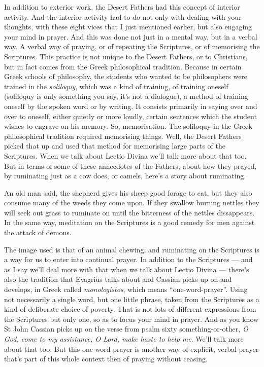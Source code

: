 In addition to exterior work, the Desert Fathers had this concept of interior activity. And the interior activity had to do not only with dealing with your thoughts, with these eight vices that I just mentioned earlier, but also engaging your mind in prayer. And this was done not just in a mental way, but in a verbal way. A verbal way of praying, or of repeating the Scriptures, or of memorising the Scriptures. This practice is not unique to the Desert Fathers, or to Christians, but in fact comes from the Greek philosophical tradition. Because in certain Greek schools of philosophy, the students who wanted to be philosophers were trained in the \emph{soliloquy}, which was a kind of training, of training oneself (soliloquy is only something you say, it's not a dialogue), a method of training oneself by the spoken word or by writing. It consists primarily in saying over and over to oneself, either quietly or more loudly, certain sentences which the student wishes to engrave on his memory. So, memorisation. The soliloquy in the Greek philosophical tradition required memorising things. Well, the Desert Fathers picked that up and used that method for memorising large parts of the Scriptures. When we talk about Lectio Divina we'll talk more about that too. But in terms of some of these annecdotes of the Fathers, about how they prayed, by ruminating just as a cow does, or camels, here's a story about ruminating.

An old man said, the shepherd gives his sheep good forage to eat, but they also consume many of the weeds they come upon. If they swallow burning nettles they will seek out grass to ruminate on until the bitterness of the nettles dissappears. In the same way, meditation on the Scriptures is a good remedy for men against the attack of demons.

The image used is that of an animal chewing, and ruminating on the Scriptures is a way for us to enter into continual prayer. In addition to the Scriptures --- and as I say we'll deal more with that when we talk about Lectio Divina --- there's also the tradition that Evagrius talks about and Cassian picks up on and develops, in Greek called \emph{monologistos}, which means ``one-word-prayer''. Using not necessarily a single word, but one little phrase, taken from the Scriptures as a kind of deliberate choice of poverty. That is not lots of different expressions from the Scriptures but only one, so as to focus your mind in prayer. And as you know St John Cassian picks up on the verse from psalm sixty something-or-other, \emph{O God, come to my assistance, O Lord, make haste to help me}. We'll talk more about that too. But this one-word-prayer is another way of explicit, verbal prayer that's part of this whole context then of praying without ceasing.


